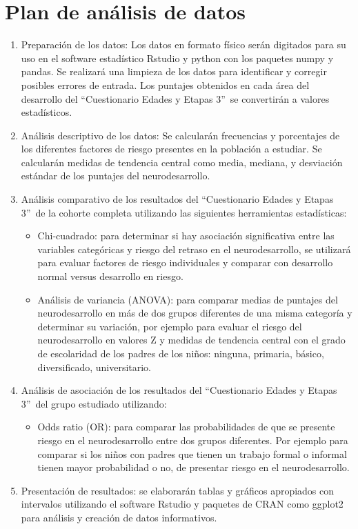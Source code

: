 \documentclass[11pt,letterpaper]{report}
\newcommand{\asq}{“Cuestionario Edades y Etapas 3”}
\begin{document}
\section{Plan de análisis de datos}
\begin{enumerate}
	\item Preparación de los datos: Los datos en formato físico serán
	digitados para su uso en el software estadístico Rstudio y python con los
	paquetes numpy y pandas. Se realizará una limpieza de los datos para
	identificar y corregir posibles errores de entrada. Los puntajes obtenidos
	en cada área del desarrollo del \asq\ se convertirán a valores
	estadísticos. 
	
	\item Análisis descriptivo de los datos: Se calcularán frecuencias y
	porcentajes de los diferentes factores de riesgo presentes en la población
	a estudiar. Se calcularán medidas de tendencia central como media, mediana,
	y desviación estándar de los puntajes del neurodesarrollo.

	\item Análisis comparativo de los resultados del \asq\ de la cohorte
	completa utilizando las siguientes herramientas estadísticas:
		\begin{itemize}
		\item Chi-cuadrado: para determinar si hay asociación significativa
		entre las variables categóricas y riesgo del retraso en el
		neurodesarrollo, se utilizará para evaluar factores de riesgo
		individuales y comparar con desarrollo normal versus desarrollo en
		riesgo.
		\item Análisis de variancia (ANOVA): para comparar medias de puntajes
		del neurodesarrollo en más de dos grupos diferentes de una misma
		categoría y determinar su variación, por ejemplo para evaluar el riesgo
		del neurodesarrollo en valores Z y medidas de tendencia central con
		el grado de escolaridad de los padres de los niños: ninguna, primaria,
		básico, diversificado, universitario.
		\end{itemize}

	\item Análisis de asociación de los resultados del \asq\ del grupo
	estudiado utilizando:
		\begin{itemize}
		\item Odds ratio (OR): para comparar las probabilidades de que se
		presente riesgo en el neurodesarrollo entre dos grupos diferentes.
		Por ejemplo para comparar si los niños con padres que tienen un trabajo
		formal o informal tienen mayor probabilidad o no, de presentar riesgo
		en el neurodesarrollo.
		\end{itemize}
	\item Presentación de resultados: se elaborarán tablas y gráficos
	apropiados con intervalos utilizando el software Rstudio y paquetes de
	CRAN como ggplot2 para análisis y creación de datos informativos.
\end{enumerate}
\end{document}
